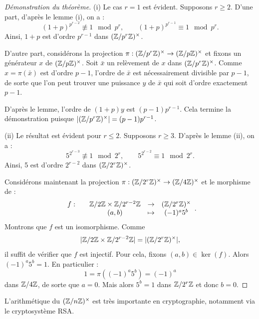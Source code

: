 \documentclass[]{report}
\begin{document}
\begin{proof}[Démonstration du théorème]
    (i) Le cas $r = 1$ est évident. Supposons $r \ge 2$. D'une part, d'après le lemme (i), on a :
    \[(1 + p)^{p^{r-2}} \not\equiv 1 \mod p^r, \qquad (1 + p)^{p^{r-1}} \equiv 1 \mod p^r.\]
    Ainsi, $1 + p$ est d'ordre $p^{r-1}$ dans $(\mathbb{Z}/p^r\mathbb{Z})^{\times}$.

    D'autre part, considérons la projection $\pi : (\mathbb{Z}/p^r\mathbb{Z})^{\times} \to (\mathbb{Z}/p\mathbb{Z})^{\times}$ et fixons un générateur $x$ de $(\mathbb{Z}/p\mathbb{Z})^{\times}$. Soit $\bar{x}$ un relèvement de $x$ dans $(\mathbb{Z}/p^r\mathbb{Z})^{\times}$. Comme $x = \pi(\bar{x})$ est d'ordre $p - 1$, l'ordre de $\bar{x}$ est nécessairement divisible par $p - 1$, de sorte que l'on peut trouver une puissance $y$ de $\bar{x}$ qui soit d'ordre exactement $p - 1$.

    D'après le lemme, l'ordre de $(1 + p)y$ est $(p - 1)p^{r-1}$. Cela termine la démonstration puisque $|(\mathbb{Z}/p^r\mathbb{Z})^{\times}| = (p - 1)p^{r-1}$.

    (ii) Le résultat est évident pour $r \le 2$. Supposons $r \ge 3$. D'après le lemme (ii), on a :
    \[5^{2^{r-3}} \not\equiv 1 \mod 2^r, \qquad 5^{2^{r-2}} \equiv 1 \mod 2^r.\]
    Ainsi, 5 est d'ordre $2^{r-2}$ dans $(\mathbb{Z}/2^r\mathbb{Z})^{\times}$.

    Considérons maintenant la projection $\pi : (\mathbb{Z}/2^r\mathbb{Z})^{\times} \to (\mathbb{Z}/4\mathbb{Z})^{\times}$ et le morphisme de \grs :
    \[\begin{array}{ccccc} f : & & \mathbb{Z}/2\mathbb{Z} \times \mathbb{Z}/2^{r-2}\mathbb{Z} & \to & (\mathbb{Z}/2^r\mathbb{Z})^{\times} \\ & & (a, b) & \mapsto & (-1)^a 5^b \end{array}.\]
    Montrons que $f$ est un isomorphisme. Comme
    \[|\mathbb{Z}/2\mathbb{Z} \times \mathbb{Z}/2^{r-2}\mathbb{Z}| = |(\mathbb{Z}/2^r\mathbb{Z})^{\times}|,\]
    il suffit de vérifier que $f$ est injectif. Pour cela, fixons $(a, b) \in \ker(f)$. Alors $(-1)^a 5^b = 1$. En particulier :
    \[1 = \pi((-1)^a 5^b) = (-1)^a\]
    dans $\mathbb{Z}/4\mathbb{Z}$, de sorte que $a = 0$. Mais alors $5^b = 1$ dans $\mathbb{Z}/2^r\mathbb{Z}$ et donc $b = 0$.
\end{proof}

L'arithmétique du \gr $(\mathbb{Z}/n\mathbb{Z})^{\times}$ est très importante en cryptographie, notamment via le cryptosystème RSA.
\end{document}
